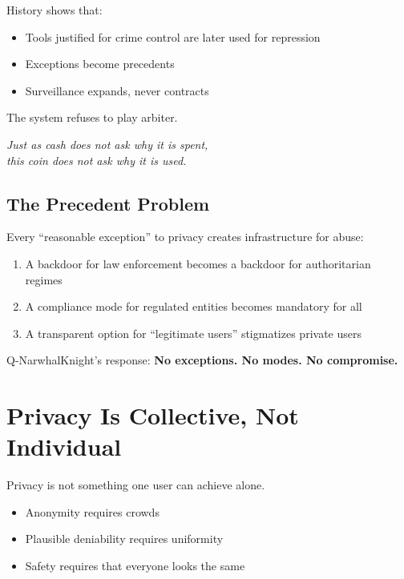 \documentclass[12pt,a4paper]{article}
\begin{document}
History shows that:
\begin{itemize}
    \item Tools justified for crime control are later used for repression
    \item Exceptions become precedents
    \item Surveillance expands, never contracts
\end{itemize}

The system refuses to play arbiter.

\begin{center}
\textit{Just as cash does not ask why it is spent,\\this coin does not ask why it is used.}
\end{center}

\subsection{The Precedent Problem}

Every ``reasonable exception'' to privacy creates infrastructure for abuse:

\begin{enumerate}
    \item A backdoor for law enforcement becomes a backdoor for authoritarian regimes
    \item A compliance mode for regulated entities becomes mandatory for all
    \item A transparent option for ``legitimate users'' stigmatizes private users
\end{enumerate}

Q-NarwhalKnight's response: \textbf{No exceptions. No modes. No compromise.}

\section{Privacy Is Collective, Not Individual}

Privacy is not something one user can achieve alone.

\begin{itemize}
    \item Anonymity requires crowds
    \item Plausible deniability requires uniformity
    \item Safety requires that everyone looks the same
\end{itemize}
\end{document}
